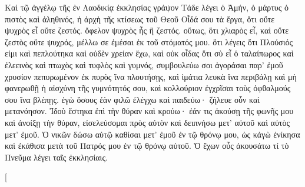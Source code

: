 \begin{pages}
\begin{Rightside}
		Καὶ τῷ ἀγγέλῳ τῆς ἐν Λαοδικίᾳ ἐκκλησίας γράψον Τάδε λέγει ὁ Ἀμήν, ὁ μάρτυς ὁ πιστὸς καὶ ἀληθινός, ἡ ἀρχὴ τῆς κτίσεως τοῦ Θεοῦ Οἶδά σου τὰ ἔργα, ὅτι οὔτε ψυχρὸς εἶ οὔτε ζεστός. ὄφελον ψυχρὸς ἦς ἢ ζεστός. οὕτως, ὅτι χλιαρὸς εἶ, καὶ οὔτε ζεστὸς οὔτε ψυχρός, μέλλω σε ἐμέσαι ἐκ τοῦ στόματός μου. ὅτι λέγεις ὅτι Πλούσιός εἰμι καὶ πεπλούτηκα καὶ οὐδὲν χρείαν ἔχω, καὶ οὐκ οἶδας ὅτι σὺ εἶ ὁ ταλαίπωρος καὶ ἐλεεινὸς καὶ πτωχὸς καὶ τυφλὸς καὶ γυμνός, συμβουλεύω σοι ἀγοράσαι παρ’ ἐμοῦ χρυσίον πεπυρωμένον ἐκ πυρὸς ἵνα πλουτήσῃς, καὶ ἱμάτια λευκὰ ἵνα περιβάλῃ καὶ μὴ φανερωθῇ ἡ αἰσχύνη τῆς γυμνότητός σου, καὶ κολλούριον ἐγχρῖσαι τοὺς ὀφθαλμούς σου ἵνα βλέπῃς. ἐγὼ ὅσους ἐὰν φιλῶ ἐλέγχω καὶ παιδεύω· ζήλευε οὖν καὶ μετανόησον. Ἰδοὺ ἕστηκα ἐπὶ τὴν θύραν καὶ κρούω· ἐάν τις ἀκούσῃ τῆς φωνῆς μου καὶ ἀνοίξῃ τὴν θύραν, εἰσελεύσομαι πρὸς αὐτὸν καὶ δειπνήσω μετ’ αὐτοῦ καὶ αὐτὸς μετ’ ἐμοῦ. Ὁ νικῶν δώσω αὐτῷ καθίσαι μετ’ ἐμοῦ ἐν τῷ θρόνῳ μου, ὡς κἀγὼ ἐνίκησα καὶ ἐκάθισα μετὰ τοῦ Πατρός μου ἐν τῷ θρόνῳ αὐτοῦ. Ὁ ἔχων οὖς ἀκουσάτω τί τὸ Πνεῦμα λέγει ταῖς ἐκκλησίαις.
		\pend
        \endnumbering
    \end{Rightside}
    \begin{Leftside}
        \beginnumbering
        \pstart[

\end{Leftside}
\end{pages}

